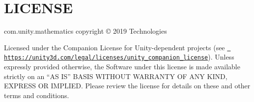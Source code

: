 \chapter{LICENSE}
\hypertarget{md__hey_tea_9_2_library_2_package_cache_2com_8unity_8mathematics_0d1_82_86_2_l_i_c_e_n_s_e}{}\label{md__hey_tea_9_2_library_2_package_cache_2com_8unity_8mathematics_0d1_82_86_2_l_i_c_e_n_s_e}
com.\+unity.\+mathematics copyright © 2019  Technologies

Licensed under the  Companion License for Unity-\/dependent projects (see \href{https://unity3d.com/legal/licenses/unity_companion_license}{\texttt{ https\+://unity3d.\+com/legal/licenses/unity\+\_\+companion\+\_\+license}}). Unless expressly provided otherwise, the Software under this license is made available strictly on an “\+AS IS” BASIS WITHOUT WARRANTY OF ANY KIND, EXPRESS OR IMPLIED. Please review the license for details on these and other terms and conditions. 